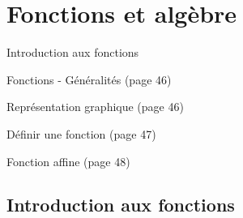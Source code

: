 \documentclass[a4paper,11pt]{report}
\begin{document}
\newcommand{\chapterName}{Fonctions et algèbre}
\newcommand{\serieName}{Introduction aux fonctions}

\chapter*{\chapterName}
\thispagestyle{empty}
%
\begin{amL}{\serieName}{
\item Fonctions - Généralités (page 46)
\item Représentation graphique (page 46)
\item Définir une fonction (page 47)
\item Fonction affine (page 48)
}\end{amL}

\section*{\serieName}
\setcounter{page}{1}
\end{document}
